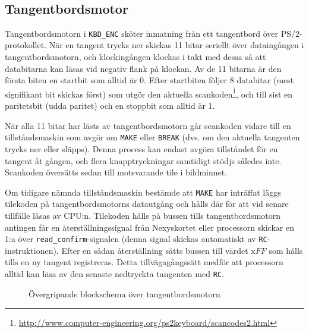 \documentclass[]{article}
\begin{document}
\\

\subsection{Tangentbordsmotor}
Tangentbordsmotorn i \texttt{KBD\_ENC} sköter inmatning från ett tangentbord över PS/2-protokollet. När en tangent trycks ner skickas 11 bitar seriellt över dataingången i tangentbordsmotorn, och klockingången klockas i takt med dessa så att databitarna kan läsas vid negativ flank på klockan. Av de 11 bitarna är den första biten en startbit som alltid är 0. Efter startbiten följer 8 databitar (mest signifikant bit skickas först)  som utgör den aktuella scankoden\footnote{\url{http://www.computer-engineering.org/ps2keyboard/scancodes2.html}}, och till sist en paritetsbit (udda paritet) och en stoppbit som alltid är 1.

När alla 11 bitar har lästs av tangentbordsmotorn går scankoden vidare till en tillståndsmaskin som avgör om \texttt{MAKE} eller \texttt{BREAK} (dvs. om den aktuella tangenten trycks ner eller släpps). Denna process kan endast avgöra tillståndet för en tangent åt gången, och flera knapptryckningar samtidigt stödjs således inte. Scankoden översätts sedan till motsvarande tile i bildminnet.

Om tidigare nämnda tillståndsmaskin bestämde att \texttt{MAKE} har inträffat läggs tilekoden på tangentbordsmotorns datautgång och hålls där för att vid senare tillfälle läsas av CPU:n. Tilekoden hålls på bussen tills tangentbordsmotorn antingen får en återställningssignal från Nexyskortet eller processorn skickar en 1:a över \texttt{read\_confirm}-signalen (denna signal skickas automatiskt av \texttt{RC}-instruktionen). Efter en sådan återställning sätts bussen till värdet x$FF$ som hålls tills en ny tangent registreras. Detta tillvägagångssätt medför att processorn alltid kan läsa av den senaste nedtryckta tangenten med \texttt{RC}.

\begin{figure}[h!]
	\caption{Övergripande blockschema över tangentbordsmotorn}
\end{figure}
\end{document}
